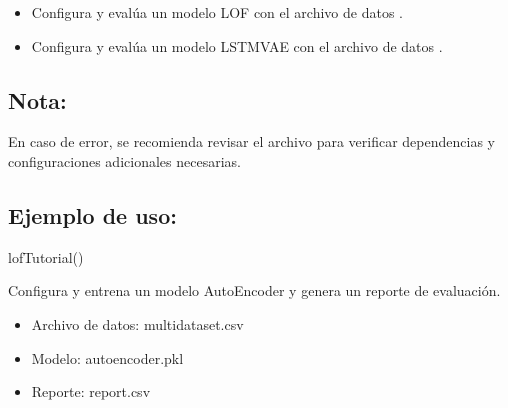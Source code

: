 \documentclass[letterpaper,10pt,english]{sphinxmanual}
\begin{document}
\begin{itemize}
\begin{description}
\end{description}

\item {} \begin{description}
\sphinxAtStartPar
Configura y evalúa un modelo LOF con el archivo de datos .

\end{description}

\item {} \begin{description}
\sphinxAtStartPar
Configura y evalúa un modelo LSTM\sphinxhyphen{}VAE con el archivo de datos .

\end{description}

\end{itemize}


\subsection{Nota:}
\label{\detokenize{tutorial:nota}}
\sphinxAtStartPar
En caso de error, se recomienda revisar el archivo  para verificar dependencias y configuraciones adicionales necesarias.


\subsection{Ejemplo de uso:}
\label{\detokenize{tutorial:ejemplo-de-uso}}\begin{description}
\sphinxAtStartPar
lofTutorial()

\end{description}

\begin{fulllineitems}
\label{\detokenize{tutorial:tutorial.autoencoderTutorial}}
\pysigstartsignatures
{}
\pysigstopsignatures
\sphinxAtStartPar
Configura y entrena un modelo AutoEncoder y genera un reporte de evaluación.
\begin{itemize}
\item {} 
\sphinxAtStartPar
Archivo de datos: multi\sphinxhyphen{}dataset.csv

\item {} 
\sphinxAtStartPar
Modelo: autoencoder.pkl

\item {} 
\sphinxAtStartPar
Reporte: report.csv

\end{itemize}

\end{fulllineitems}
\end{document}
